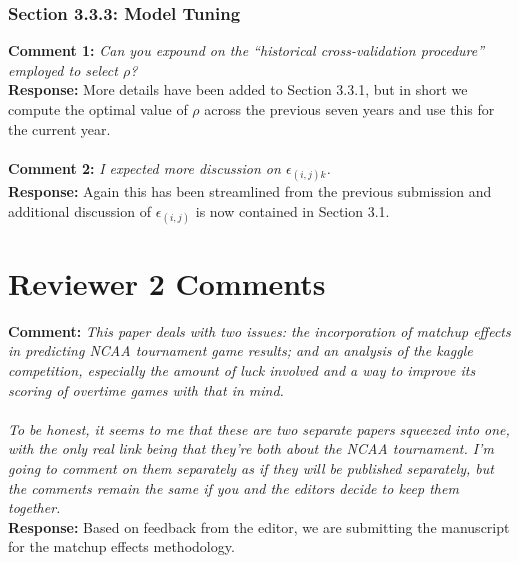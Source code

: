 \documentclass[11pt]{article} %
\begin{document}
\subsubsection*{Section 3.3.3: Model Tuning}
{\bf Comment 1:} \emph{Can you expound on the ``historical cross-validation procedure'' employed to select $\rho$?\\}
{\bf Response:} More details have been added to Section 3.3.1, but in short we compute the optimal value of $\rho$ across the previous seven years and use this for the current year.\\
\\
{\bf Comment 2:} \emph{I expected more discussion on $\epsilon_{(i,j)k}$.\\}
{\bf Response:}  Again this has been streamlined from the previous submission and additional discussion of $\epsilon_{(i,j)}$ is now contained in Section 3.1.\\

\section*{Reviewer 2 Comments}
{\bf Comment:} \emph{This paper deals with two issues: the incorporation of matchup effects in predicting NCAA tournament game results; and an analysis of the kaggle competition, especially the amount of luck involved and a way to improve its scoring of overtime games with that in mind.\\
\\
To be honest, it seems to me that these are two separate papers squeezed into one, with the only real link being that they're both about the NCAA tournament. I'm going to comment on them separately as if they will be published separately, but the comments remain the same if you and the editors decide to keep them together.\\}
{\bf Response:} Based on feedback from the editor, we are submitting the manuscript for the matchup effects methodology.\\
\\
\end{document}
